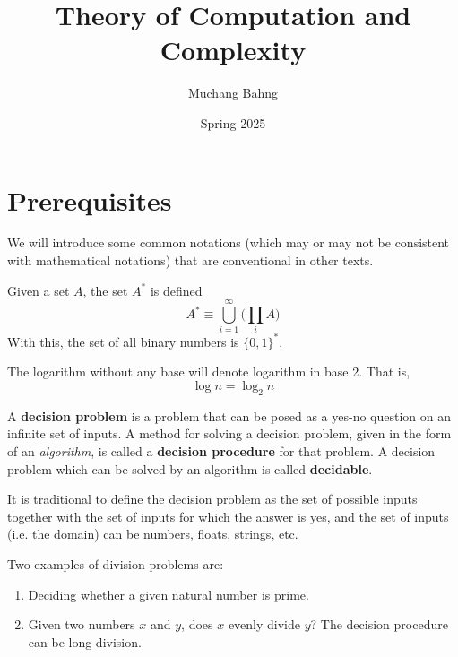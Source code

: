 \documentclass{article}
\begin{document}
\title{Theory of Computation and Complexity}
\author{Muchang Bahng}
\date{Spring 2025}

\maketitle
\tableofcontents
\pagebreak

\section{Prerequisites}

  We will introduce some common notations (which may or may not be consistent with mathematical notations) that are conventional in other texts. 

  \begin{definition}
  Given a set $A$, the set $A^*$ is defined 
  \[A^* \equiv \bigcup_{i=1}^\infty \bigg(\prod_i A\bigg) \]
  With this, the set of all binary numbers is $\{0,1\}^*$. 
  \end{definition}

  \begin{definition}
  The logarithm without any base will denote logarithm in base 2. That is, 
  \[\log n = \log_2 n\]
  \end{definition}

  \begin{definition}
  A \textbf{decision problem} is a problem that can be posed as a yes-no question on an infinite set of inputs. A method for solving a decision problem, given in the form of an \textit{algorithm}, is called a \textbf{decision procedure} for that problem. A decision problem which can be solved by an algorithm is called \textbf{decidable}. 
  \end{definition}

  It is traditional to define the decision problem as the set of possible inputs together with the set of inputs for which the answer is yes, and the set of inputs (i.e. the domain) can be numbers, floats, strings, etc. 

  \begin{example}
  Two examples of division problems are: 
  \begin{enumerate}
      \item Deciding whether a given natural number is prime. 
      \item Given two numbers $x$ and $y$, does $x$ evenly divide $y$? The decision procedure can be long division. 
  \end{enumerate}
  \end{example}
\end{document}
